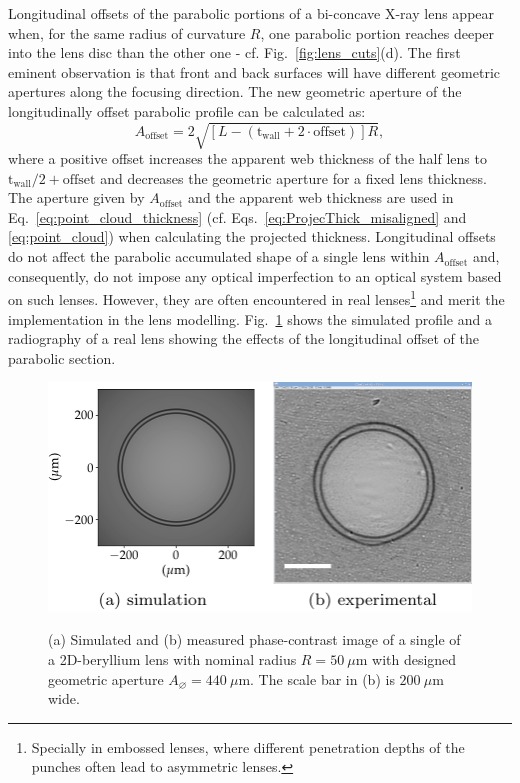 \begin{refsection}
Longitudinal offsets of the parabolic portions of a bi-concave X-ray lens appear when, for the same radius of curvature $R$, one parabolic portion reaches deeper into the lens disc than the other one - cf. Fig.~\ref{fig:lens_cuts}(d). The first eminent observation is that front and back surfaces will have different geometric apertures along the focusing direction. The new geometric aperture of the longitudinally offset parabolic profile can be calculated as:
\begin{equation}\label{eq:A_2}
    A_{\text{offset}} = 2\sqrt{[L-(\text{t}_\text{wall}+2\cdot\text{offset})]R},
\end{equation}{}
where a positive offset increases the apparent web thickness of the half lens to $\text{t}_\text{wall}/2+\text{offset}$ and decreases the geometric aperture for a fixed lens thickness. The aperture given by $A_{\text{offset}}$ and the apparent web thickness are used in Eq.~\ref{eq:point_cloud_thickness} (cf. Eqs.~\ref{eq:ProjecThick_misaligned} and \ref{eq:point_cloud}) when calculating the projected thickness.
Longitudinal offsets do not affect the parabolic accumulated shape of a single lens within $A_{\text{offset}}$ and, consequently, do not impose any optical imperfection to an optical system based on such lenses. However, they are often encountered in real lenses\footnote{Specially in embossed lenses, where different penetration depths of the punches often lead to asymmetric lenses.} and merit the implementation in the lens modelling. Fig.~\ref{fig:longitudinal_offset} shows the simulated profile and a radiography of a real lens showing the effects of the longitudinal offset of the parabolic section.

\begin{figure}[t]
        \centering
        {\includegraphics[height=3.cm]{figures/ch04/longitudinal_offset.pdf}}
        \caption[Effects of the longitudinal offset of the parabolic section]{(a) Simulated and (b) measured phase-contrast image of a single of a 2D-beryllium lens with nominal radius $R=50~\mu\text{m}$ with designed geometric aperture $A_{\diameter}=440~\mu\text{m}$. The scale bar in (b) is $200~\mu$m wide.} \label{fig:longitudinal_offset}
\end{figure}


\end{refsection}
